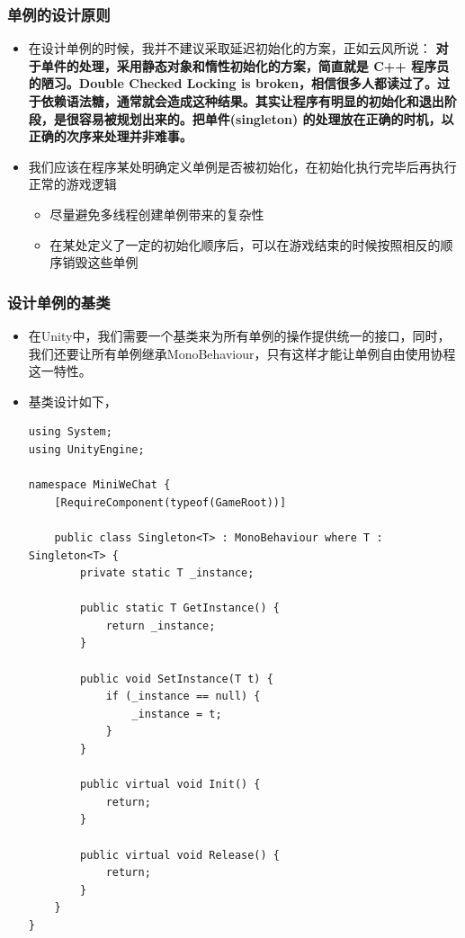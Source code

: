\documentclass[9pt, b5paper]{article}
\begin{document}
\subsubsection{单例的设计原则}
\label{sec:org87b119a}
\begin{itemize}
\item 在设计单例的时候，我并不建议采取延迟初始化的方案，正如云风所说： \textbf{对于单件的处理，采用静态对象和惰性初始化的方案，简直就是 C++ 程序员的陋习。Double Checked Locking is broken，相信很多人都读过了。过于依赖语法糖，通常就会造成这种结果。其实让程序有明显的初始化和退出阶段，是很容易被规划出来的。把单件(singleton) 的处理放在正确的时机，以正确的次序来处理并非难事。}
\item 我们应该在程序某处明确定义单例是否被初始化，在初始化执行完毕后再执行正常的游戏逻辑
\begin{itemize}
\item 尽量避免多线程创建单例带来的复杂性
\item 在某处定义了一定的初始化顺序后，可以在游戏结束的时候按照相反的顺序销毁这些单例
\end{itemize}
\end{itemize}
\subsubsection{设计单例的基类}
\label{sec:org502d5a5}
\begin{itemize}
\item 在Unity中，我们需要一个基类来为所有单例的操作提供统一的接口，同时，我们还要让所有单例继承MonoBehaviour，只有这样才能让单例自由使用协程这一特性。
\item 基类设计如下，
\begin{verbatim}
using System;
using UnityEngine;

namespace MiniWeChat {
    [RequireComponent(typeof(GameRoot))]

    public class Singleton<T> : MonoBehaviour where T : Singleton<T> {    
        private static T _instance;

        public static T GetInstance() {        
            return _instance;
        }

        public void SetInstance(T t) {        
            if (_instance == null) {            
                _instance = t;
            }
        }

        public virtual void Init() {        
            return;
        }

        public virtual void Release() {        
            return;
        }
    }
}
\end{verbatim}
\end{itemize}
\end{document}

